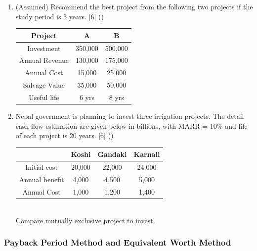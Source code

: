\documentclass[12pt]{article}
\begin{document}
\begin{enumerate}
		\item (Assumed) Recommend the best project from the following two projects if the study period is 5 years. \hfill [6] ()\\
		\begin{tabular}{|c|c|c|}
			\hline
			Project & A & B \\ \hline
			Investment & 350,000 & 500,000 \\ \hline
			Annual Revenue & 130,000 & 175,000 \\ \hline
			Annual Cost & 15,000 & 25,000 \\ \hline
			Salvage Value & 35,000 & 50,000 \\ \hline
			Useful life & 6 yrs & 8 yrs \\ \hline
		\end{tabular}
		
		\item Nepal government is planning to invest three irrigation projects. The detail cash flow estimation are given below in billions, with MARR = 10\% and life of each project is 20 years. \hfill [6] ()
		\begin{tabular}{|c|c|c|c|}
			\hline
			& Koshi & Gandaki & Karnali \\ \hline
			Initial cost & 20,000 & 22,000 & 24,000 \\ \hline
			Annual benefit & 4,000 & 4,500 & 5,000 \\ \hline
			Annual Cost & 1,000 & 1,200 & 1,400 \\ \hline
		\end{tabular}\\
		Compare mutually exclusive project to invest.
	\end{enumerate}
	
	\subsubsection{Payback Period Method and Equivalent Worth Method}
\end{document}
